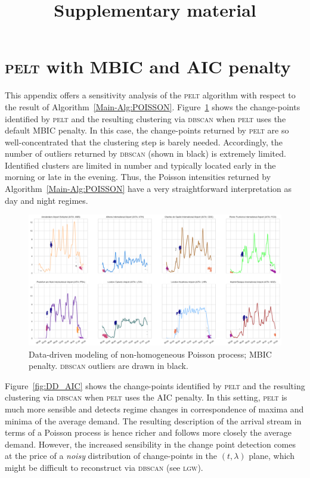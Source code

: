\documentclass[]{elsarticle}
\newcommand{\PELT}{\textsc{pelt}}
\newcommand{\DBSCAN}{\textsc{dbscan}}
\newcommand{\airp}[1]{\textcolor{#1}{\textsc{#1}}}
\begin{document}
\begin{frontmatter}

\title{Supplementary material}

\end{frontmatter}

\appendix

\section{\PELT{} with \acs{MBIC} and \acs{AIC} penalty}\label{sec:appa}

  This appendix offers a sensitivity analysis of the \PELT{} algorithm with respect to the result of Algorithm~\ref{Main-Alg:POISSON}.
  Figure~\ref{fig:DD_MBIC} shows the change-points identified by \PELT{} and the resulting clustering via \DBSCAN{} when \PELT{} uses the default \ac{MBIC} penalty.
  In this case, the change-points returned by \PELT{} are so well-concentrated that the clustering step is barely needed.
  Accordingly, the number of outliers returned by \DBSCAN{} (shown in black) is extremely limited.
  Identified clusters are limited in number and typically located early in the morning or late in the evening.
  Thus, the Poisson intensities returned by Algorithm~\ref{Main-Alg:POISSON} have a very straightforward interpretation as day and night regimes.

  \begin{figure}
      \includegraphics[width=\textwidth]{DDPoisson_MBIC}
      \caption{Data-driven modeling of non-homogeneous Poisson process; \ac{MBIC} penalty. \DBSCAN{} outliers are drawn in black.}\label{fig:DD_MBIC}
  \end{figure}

  Figure~\ref{fig:DD_AIC} shows the change-points identified by \PELT{} and the resulting clustering via \DBSCAN{} when \PELT{} uses the \ac{AIC} penalty.
  In this setting, \PELT{} is much more sensible and detects regime changes in correspondence of maxima and minima of the average demand.
  The resulting description of the arrival stream in terms of a Poisson process is hence richer and follows more closely the average demand.
  However, the increased sensibility in the change point detection comes at the price of a \emph{noisy} distribution of change-points in the \((t,\lambda)\) plane, which might be difficult to reconstruct via \DBSCAN{} (see \airp{lgw}).
\end{document}
